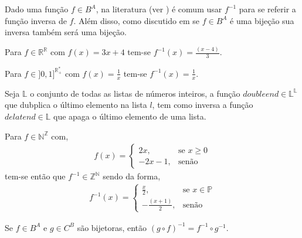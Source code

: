 \begin{atencao}
  Dado uma função $f \in B^A$, na literatura (ver \cite{lipschutz1978-TC, lipschutz2013-MD}) é comum usar $f^{-1}$ para se referir a função inversa de $f$. Além disso, como discutido em \cite{carmo2013} se $f \in B^A$ é uma bijeção sua inversa também será uma bijeção.
\end{atencao}


\begin{exemplo}\label{exe:FuncaoInversa1}
	Para $f \in \mathbb{R}^\mathbb{R}$ com $f(x) = 3x + 4$ tem-se $f^{-1}(x) = \frac{(x - 4)}{3}$.
\end{exemplo}

\begin{exemplo}\label{exe:FuncaoInversa2}
	Para $f \in ]0,1]^{\mathbb{R}^*_+}$ com $f(x) = \frac{1}{x}$ tem-se $f^{-1}(x) = \frac{1}{x}$.
\end{exemplo}

\begin{exemplo}\label{exe:FuncaoInversa3}
	Seja $\mathbb{L}$ o conjunto de todas as listas de números inteiros, a função $doubleend \in \mathbb{L}^\mathbb{L}$ que dubplica o último elemento na lista $l$, tem como inversa a função $delatend \in \mathbb{L}$ que apaga o último elemento de uma lista.
\end{exemplo}

\begin{exemplo}\label{exe:FuncaoInversa4}
	Para $f \in \mathbb{N}^\mathbb{Z}$ com, 
	\begin{eqnarray*}
		f(x) = \left\{\begin{array}{ll}
			2x, & \text{se } x \geq 0\\
			-2x - 1, & \text{senão}
		\end{array}\right.
	\end{eqnarray*}
	tem-se então que $f^{-1} \in \mathbb{Z}^\mathbb{N}$ sendo da forma,
	\begin{eqnarray*}
		f^{-1}(x) = \left\{\begin{array}{ll}
			\frac{x}{2}, & \text{se } x \in \mathbb{P}\\
			-\frac{(x + 1)}{2}, & \text{senão}
		\end{array}\right.
	\end{eqnarray*}
\end{exemplo}

\begin{teorema}
	Se $f \in B^A$ e $g \in C^B$ são bijetoras, então $(g \circ f)^{-1} = f^{-1} \circ g^{-1}$.
\end{teorema}

